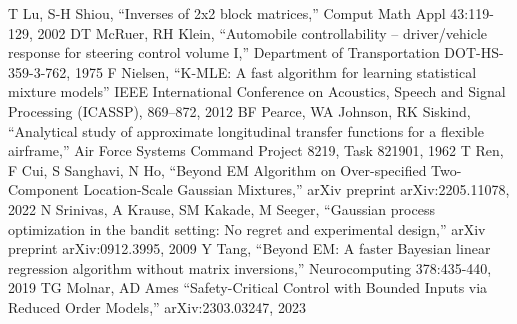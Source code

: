 \documentclass[letterpaper, 10 pt, conference]{ieeeconf}  %
\begin{document}
\begin{thebibliography}{00}
 T Lu, S-H Shiou, ``Inverses of 2x2 block matrices,'' Comput Math Appl 43:119-129, 2002
 DT McRuer, RH Klein, ``Automobile controllability -- driver/vehicle response for steering control volume I,'' Department of Transportation DOT-HS-359-3-762, 1975
 F Nielsen, ``K-MLE: A fast algorithm for learning statistical mixture models'' IEEE International Conference on Acoustics, Speech and Signal Processing (ICASSP), 869–872, 2012
 BF Pearce, WA Johnson, RK Siskind, ``Analytical study of approximate longitudinal transfer functions for a flexible airframe,'' Air Force Systems Command Project 8219, Task 821901, 1962
 T Ren, F Cui, S Sanghavi, N Ho, ``Beyond EM Algorithm on Over-specified Two-Component Location-Scale Gaussian Mixtures,'' arXiv preprint arXiv:2205.11078, 2022
 N Srinivas, A Krause, SM Kakade, M Seeger, ``Gaussian process optimization in the bandit setting: No regret and experimental design,'' arXiv preprint arXiv:0912.3995, 2009
 Y Tang, ``Beyond EM: A faster Bayesian linear regression algorithm without matrix inversions,'' Neurocomputing 378:435-440, 2019
 TG Molnar, AD Ames ``Safety-Critical Control with Bounded Inputs via Reduced Order Models,'' arXiv:2303.03247, 2023
\end{thebibliography}
\end{document}
